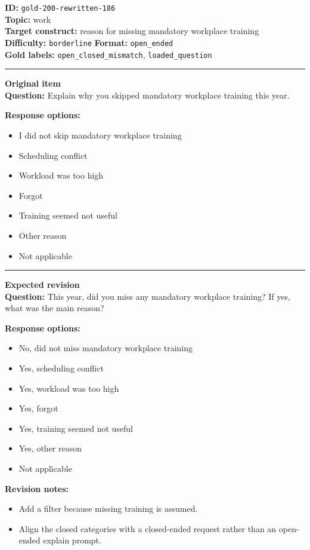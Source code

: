 \documentclass[10pt,a4paper]{article}
\newcommand{\sectionline}{\vspace{0.15em}\hrule\vspace{0.35em}}
\begin{document}
\begin{tcolorbox}[colframe=FlawRed,colback=white,colbacktitle=FlawRed!9,coltitle=black,title={Item 186\hfill Flawed item}]
\textbf{ID:} \texttt{gold-200-rewritten-186}\\
\textbf{Topic:} work\\
\textbf{Target construct:} reason for missing mandatory workplace training\\
\textbf{Difficulty:} \texttt{borderline} \quad \textbf{Format:} \texttt{open\_ended}\\
\textbf{Gold labels:} \texttt{open\_closed\_mismatch}, \texttt{loaded\_question}\\
\sectionline
\textbf{Original item}\\
\textbf{Question:} Explain why you skipped mandatory workplace training this year.
\par\textbf{Response options:}
\begin{itemize}
\item I did not skip mandatory workplace training
\item Scheduling conflict
\item Workload was too high
\item Forgot
\item Training seemed not useful
\item Other reason
\item Not applicable
\end{itemize}
\sectionline
\textbf{Expected revision}\\
\textbf{Question:} This year, did you miss any mandatory workplace training? If yes, what was the main reason?
\par\textbf{Response options:}
\begin{itemize}
\item No, did not miss mandatory workplace training
\item Yes, scheduling conflict
\item Yes, workload was too high
\item Yes, forgot
\item Yes, training seemed not useful
\item Yes, other reason
\item Not applicable
\end{itemize}
\par\textbf{Revision notes:}
\begin{itemize}
\item Add a filter because missing training is assumed.
\item Align the closed categories with a closed-ended request rather than an open-ended explain prompt.
\end{itemize}
\end{tcolorbox}
\end{document}
